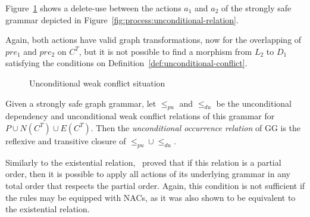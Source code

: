 \begin{example} Figure~\ref{fig:process:unconditional-relation:conflict} shows a delete-use between the actions $a_1$ and $a_2$ of the strongly safe grammar depicted in Figure~\ref{fig:process:unconditional-relation}.

  Again, both actions have valid graph transformations, now for the overlapping of $pre_1$ and $pre_2$ on $C^T$, but it is not possible to find a morphism from $L_2$ to $D_1$ satisfying the conditions on Definition~\ref{def:unconditional-conflict}.
\begin{figure}[!ht]
  \centering
  \caption{Unconditional weak conflict situation}\label{fig:process:unconditional-relation:conflict}
\end{figure}
\end{example}

\begin{definition} Given \doublyTypedGraphGrammarCore{} a strongly safe graph grammar, let $\leq_{pu}$ and $\leq_{du}$ be the unconditional dependency and unconditional weak conflict relations of this grammar for $P \cup N(C^T) \cup E(C^T)$. Then the \emph{unconditional occurrence relation} of GG is the reflexive and transitive closure of \mbox{$\leq_{pu} \cup \leq_{du}$}.
\end{definition}

Similarly to the existential relation,~\cite{Ribeiro1996} proved that if this relation is a partial order, then it is possible to apply all actions of its underlying grammar in any total order that respects the partial order. Again, this condition is not sufficient if the rules may be equipped with NACs, as it was also shown to be equivalent to the existential relation.

